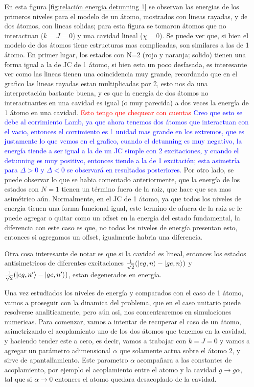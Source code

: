En esta figura \ref{fig:relación energia detunning 1} se observan las energias de los primeros niveles para el modelo de un átomo, mostrados con lineas rayadas, y de dos átomos, con lineas solidas; para esta figura se tomaron átomos que no interactuan ($k=J=0$) y una cavidad lineal ($\chi=0$). Se puede ver que, si bien el modelo de dos átomos tiene estructuras mas complicadas, son similares a las de 1 átomo. En primer lugar, los estados con N=2 (rojo y naranja; solido) tienen una forma igual a la de JC de 1 átomo, si bien esta un poco desfasada, es interesante ver como las lineas tienen una coincidencia muy grande, recordando que en el grafico las lineas rayadas estan multiplicadas por 2, esto nos da una interpretación bastante buena, y es que la energía de dos átomos no interactuantes en una cavidad es igual (o muy parecida) a dos veces la energía de 1 átomo en una cavidad. \textcolor{red}{Esto tengo que chequear con cuentas} \textcolor{blue}{Creo que esto se debe al corrimiento Lamb, ya que ahora tenemos dos átomos que interactuan con el vacio, entonces el corrimiento es 1 unidad mas grande en los extremos, que es justamente lo que vemos en el grafico, cuando el detunning es muy negativo, la energ\'ia tiende a ser igual a la de un JC simple con 2 excitaciones, y cuando el detunning es muy positivo, entonces tiende a la de 1 excitaci\'on; esta asimetr\'ia para $\Delta>0$ y $\Delta<0$ se observar\'a en resultados posteriores.} Por otro lado, se puede observar lo que se habia comentado anteriormente, que la energ\'ia de los estados con $N=1$ tienen un t\'ermino fuera de la raiz, que hace que sea mas asim\'etrico a\'un. Normalmente, en el JC de 1 átomo, ya que todos los niveles de energía tienen una forma funcional igual, este termino de afuera de la raiz se le puede agregar o quitar como un offset en la energía del estado fundamental, la diferencia con este caso es que, no todos los niveles de energía presentan esto, entonces si agregamos un offset, igualmente habria una diferencia. 

Otra cosa interesante de notar es que si la cavidad es lineal, entonces los estados antisimetricos de diferentes excitaciones $\frac{1}{\sqrt{2}}(\ket{eg,n}-\ket{ge,n})$ y $\frac{1}{\sqrt{2}}(\ket{eg,n'}-\ket{ge,n'})$, estan degenerados en energía.

Una vez estudiados los niveles de energía y comparados con el caso de 1 átomo, vamos a proseguir con la dinamica del problema, que en el caso unitario puede resolverse analiticamente, pero a\'un asi, nos concentraremos en simulaciones numericas.
Para comenzar, vamos a intentar de recuperar el caso de un átomo, asimetrizando el acoplamiento uno de los dos átomos que tenemos en la cavidad, y haciendo tender este a cero, es decir, vamos a trabajar con $k=J=0$ y vamos a agregar un parámetro adimensional $\alpha$ que solamente actua sobre el átomo 2, y sirve de apantallamiento. Este parametro $\alpha$ acompañara a las constantes de acoplamiento, por ejemplo el acoplamiento entre el atomo y la cavidad $g\rightarrow g\alpha$, tal que si $\alpha \rightarrow 0$ entonces el atomo quedara desacoplado de la cavidad. 

